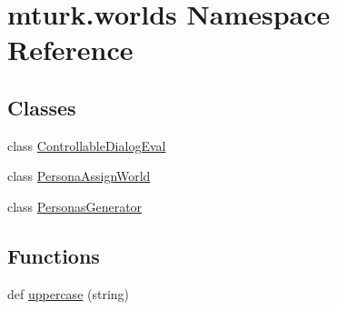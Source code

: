 \hypertarget{namespacemturk_1_1worlds}{}\section{mturk.\+worlds Namespace Reference}
\label{namespacemturk_1_1worlds}
\subsection*{Classes}
\begin{DoxyCompactItemize}
\item 
class \hyperlink{classmturk_1_1worlds_1_1ControllableDialogEval}{Controllable\+Dialog\+Eval}
\item 
class \hyperlink{classmturk_1_1worlds_1_1PersonaAssignWorld}{Persona\+Assign\+World}
\item 
class \hyperlink{classmturk_1_1worlds_1_1PersonasGenerator}{Personas\+Generator}
\end{DoxyCompactItemize}
\subsection*{Functions}
\begin{DoxyCompactItemize}
\item 
def \hyperlink{namespacemturk_1_1worlds_ab708bf300fdd999b3a3d6bde99cf03c8}{uppercase} (string)
\end{DoxyCompactItemize}
